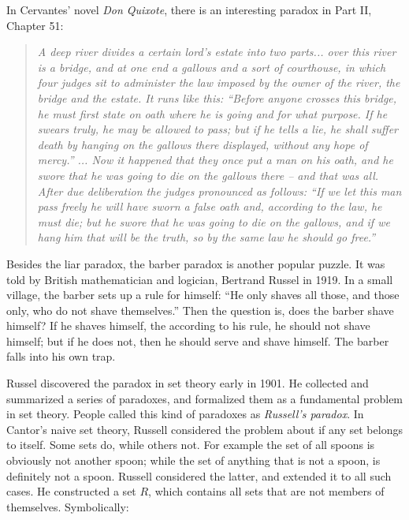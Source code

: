 \documentclass{article}
\begin{document}
In Cervantes' novel {\em Don Quixote}, there is an interesting paradox in Part II, Chapter 51:

\begin{quotation}
\itshape
A deep river divides a certain lord’s estate into two parts... over this river is a bridge, and at one end a gallows and a sort of courthouse, in which four judges sit to administer the law imposed by the owner of the river, the bridge and the estate. It runs like this: ``Before anyone crosses this bridge, he must first state on oath where he is going and for what purpose. If he swears truly, he may be allowed to pass; but if he tells a lie, he shall suffer death by hanging on the gallows there displayed, without any hope of mercy.'' ... Now it happened that they once put a man on his oath, and he swore that he was going to die on the gallows there -- and that was all. After due deliberation the judges pronounced as follows: ``If we let this man pass freely he will have sworn a false oath and, according to the law, he must die; but he swore that he was going to die on the gallows, and if we hang him that will be the truth, so by the same law he should go free.''
\end{quotation}

Besides the liar paradox, the barber paradox is another popular puzzle. It was told by British mathematician and logician, Bertrand Russel in 1919. In a small village, the barber sets up a rule for himself: ``He only shaves all those, and those only, who do not shave themselves.'' Then the question is, does the barber shave himself? If he shaves himself, the according to his rule, he should not shave himself; but if he does not, then he should serve and shave himself. The barber falls into his own trap.

Russel discovered the paradox in set theory early in 1901. He collected and summarized a series of paradoxes, and formalized them as a fundamental problem in set theory. People called this kind of paradoxes as {\em Russell's paradox}. In Cantor's naive set theory, Russell considered the problem about if any set belongs to itself. Some sets do, while others not. For example the set of all spoons is obviously not another spoon; while the set of anything that is not a spoon, is definitely not a spoon. Russell considered the latter, and extended it to all such cases. He constructed a set $R$, which contains all sets that are not members of themselves. Symbolically:
\end{document}
